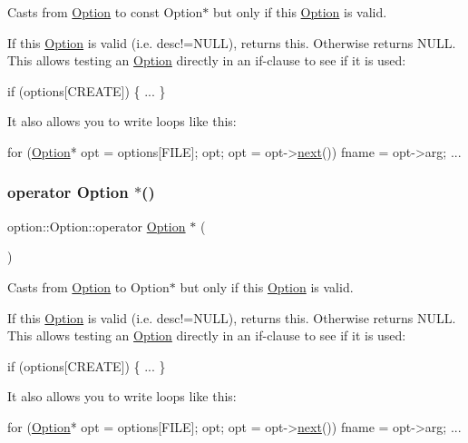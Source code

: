 Casts from \hyperlink{classoption_1_1_option}{Option} to const Option$\ast$ but only if this \hyperlink{classoption_1_1_option}{Option} is valid. 

If this \hyperlink{classoption_1_1_option}{Option} is valid (i.\+e. {\ttfamily desc!=N\+U\+LL}), returns this. Otherwise returns N\+U\+LL. This allows testing an \hyperlink{classoption_1_1_option}{Option} directly in an if-\/clause to see if it is used\+: 
\begin{DoxyCode}
\textcolor{keywordflow}{if} (options[CREATE])
\{
  ...
\}
\end{DoxyCode}
 It also allows you to write loops like this\+: 
\begin{DoxyCode}
\textcolor{keywordflow}{for} (\hyperlink{classoption_1_1_option_aa2810152fc23b14175b115d1a7d38095}{Option}* opt = options[FILE]; opt; opt = opt->\hyperlink{classoption_1_1_option_a59ae9aed505f4d410633bb36478a32be}{next}())
 fname = opt->arg; ... 
\end{DoxyCode}
 \mbox{\label{classoption_1_1_option_ac5b9235d79208035d97e41fe17ba04d6}} 
\subsubsection{\texorpdfstring{operator Option $\ast$()}{operator Option *()}}
{\footnotesize\ttfamily option\+::\+Option\+::operator \hyperlink{classoption_1_1_option}{Option} $\ast$ (\begin{DoxyParamCaption}{ }\end{DoxyParamCaption})\hspace{0.3cm}{\ttfamily [inline]}}



Casts from \hyperlink{classoption_1_1_option}{Option} to Option$\ast$ but only if this \hyperlink{classoption_1_1_option}{Option} is valid. 

If this \hyperlink{classoption_1_1_option}{Option} is valid (i.\+e. {\ttfamily desc!=N\+U\+LL}), returns this. Otherwise returns N\+U\+LL. This allows testing an \hyperlink{classoption_1_1_option}{Option} directly in an if-\/clause to see if it is used\+: 
\begin{DoxyCode}
\textcolor{keywordflow}{if} (options[CREATE])
\{
  ...
\}
\end{DoxyCode}
 It also allows you to write loops like this\+: 
\begin{DoxyCode}
\textcolor{keywordflow}{for} (\hyperlink{classoption_1_1_option_aa2810152fc23b14175b115d1a7d38095}{Option}* opt = options[FILE]; opt; opt = opt->\hyperlink{classoption_1_1_option_a59ae9aed505f4d410633bb36478a32be}{next}())
 fname = opt->arg; ... 
\end{DoxyCode}
 \mbox{\label{classoption_1_1_option_adb4b44f3778df8f28a04c48bd1b4a72b}} 
